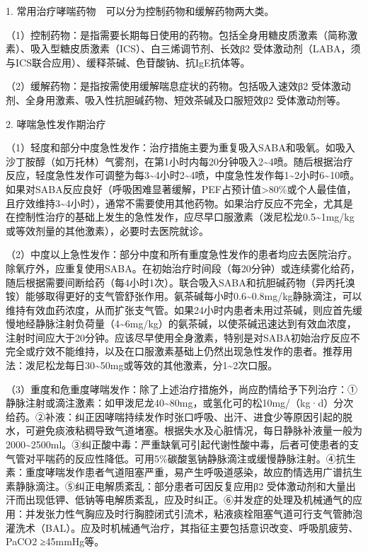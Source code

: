 1. 常用治疗哮喘药物　可以分为控制药物和缓解药物两大类。

（1）控制药物：是指需要长期每日使用的药物。包括全身用糖皮质激素（简称激素）、吸入型糖皮质激素（ICS）、白三烯调节剂、长效β{2}
受体激动剂（LABA，须与ICS联合应用）、缓释茶碱、色苷酸钠、抗IgE抗体等。

（2）缓解药物：是指按需使用缓解喘息症状的药物。包括吸入速效β{2}
受体激动剂、全身用激素、吸入性抗胆碱药物、短效茶碱及口服短效β{2}
受体激动剂等。

2. 哮喘急性发作期治疗

（1）轻度和部分中度急性发作：治疗措施主要为重复吸入SABA和吸氧。如吸入沙丁胺醇（如万托林）气雾剂，在第1小时内每20分钟吸入2\textasciitilde{}4喷。随后根据治疗反应，轻度急性发作可调整为每3\textasciitilde{}4小时2\textasciitilde{}4喷，中度急性发作每1\textasciitilde{}2小时6\textasciitilde{}10喷。如果对SABA反应良好（呼吸困难显著缓解，PEF占预计值\textgreater{}80\%或个人最佳值，且疗效维持3\textasciitilde{}4小时），通常不需要使用其他药物。如果治疗反应不完全，尤其是在控制性治疗的基础上发生的急性发作，应尽早口服激素（泼尼松龙0.5\textasciitilde{}1mg/kg或等效剂量的其他激素），必要时去医院就诊。

（2）中度以上急性发作：部分中度和所有重度急性发作的患者均应去医院治疗。除氧疗外，应重复使用SABA。在初始治疗时间段（每20分钟）或连续雾化给药，随后根据需要间断给药（每4小时1次）。联合吸入SABA和抗胆碱药物（异丙托溴铵）能够取得更好的支气管舒张作用。氨茶碱每小时0.6\textasciitilde{}0.8mg/kg静脉滴注，可以维持有效血药浓度，从而扩张支气管。如果24小时内患者未用过茶碱，则应首先缓慢地经静脉注射负荷量（4\textasciitilde{}6mg/kg）的氨茶碱，以使茶碱迅速达到有效血浓度，注射时间应大于20分钟。应该尽早使用全身激素，特别是对SABA初始治疗反应不完全或疗效不能维持，以及在口服激素基础上仍然出现急性发作的患者。推荐用法：泼尼松龙每日30\textasciitilde{}50mg或等效的其他激素，分1\textasciitilde{}2次口服。

（3）重度和危重度哮喘发作：除了上述治疗措施外，尚应酌情给予下列治疗：①静脉注射或滴注激素：如甲泼尼龙40\textasciitilde{}80mg，或氢化可的松10mg/（kg·d）分次给药。②补液：纠正因哮喘持续发作时张口呼吸、出汗、进食少等原因引起的脱水，可避免痰液粘稠导致气道堵塞。根据失水及心脏情况，每日静脉补液量一般为2000\textasciitilde{}2500ml。③纠正酸中毒：严重缺氧可引起代谢性酸中毒，后者可使患者的支气管对平喘药的反应性降低。可用5\%碳酸氢钠静脉滴注或缓慢静脉注射。④抗生素：重度哮喘发作患者气道阻塞严重，易产生呼吸道感染，故应酌情选用广谱抗生素静脉滴注。⑤纠正电解质紊乱：部分患者可因反复应用β{2}
受体激动剂和大量出汗而出现低钾、低钠等电解质紊乱，应及时纠正。⑥并发症的处理及机械通气的应用：并发张力性气胸应及时行胸腔闭式引流术，粘液痰栓阻塞气道可行支气管肺泡灌洗术（BAL）。应及时机械通气治疗，其指征主要包括意识改变、呼吸肌疲劳、PaCO{2}
≥45mmHg等。

